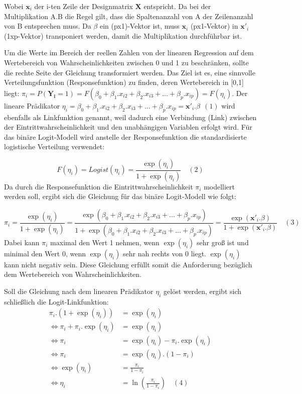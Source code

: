 \documentclass[12pt,]{article}
\begin{document}
Wobei \(\mathbf{x}_i\) der i-ten Zeile der Designmatrix \(\mathbf{X}\)
entspricht. Da bei der Multiplikation A.B die Regel gilt, dass die
Spaltenanzahl von A der Zeilenanzahl von B entsprechen muss. Da
\(\beta\) ein (px1)-Vektor ist, muss \(\mathbf{x}_i\) (px1-Vektor) in
\(\mathbf{x'}_i\) (1xp-Vektor) transponiert werden, damit die
Multiplikation durchführbar ist.

Um die Werte im Bereich der reellen Zahlen von der linearen Regression
auf dem Wertebereich von Wahrscheinlichkeiten zwischen 0 und 1 zu
beschränken, sollte die rechte Seite der Gleichung transformiert werden.
Das Ziel ist es, eine sinnvolle Verteilungsfunktion (Responsefunktion)
zu finden, deren Wertebereich in {[}0,1{]} liegt:
\(\pi_i = P(\mathbf{Y_i} = 1) = F(\beta_0 + \beta_1.x_{i2} + \beta_2.x_{i3} + ... + \beta_p.x_{ip}) = F(\eta_i)\).
Der lineare Prädikator
\(\eta_i = \beta_0 + \beta_1.x_{i2} + \beta_2.x_{i3} + ... + \beta_p.x_{ip} = \mathbf{x'}_i.\beta \ \ (1)\)
wird ebenfalls als Linkfunktion genannt, weil dadurch eine Verbindung
(Link) zwischen der Eintrittwahrscheinlichkeit und den unabhängigen
Variablen erfolgt wird. Für das binäre Logit-Modell wird anstelle der
Responsefunktion die standardisierte logistische Verteilung verwendet:

\[
F(\eta_i) = Logist(\eta_i) = \frac{\exp(\eta_i)}{1 + \exp(\eta_i)} \quad (2)
\] Da durch die Responsefunktion die Eintrittwahrscheinlichkeit
\(\pi_i\) modelliert werden soll, ergibt sich die Gleichung für das
binäre Logit-Modell wie folgt:

\[
\pi_i = \frac{\exp(\eta_i)}{1 + \exp(\eta_i)} = \frac{\exp(\beta_0 + \beta_1.x_{i2} + \beta_2.x_{i3} + ... + \beta_p.x_{ip})}{1 + \exp(\beta_0 + \beta_1.x_{i2} + \beta_2.x_{i3} + ... + \beta_p.x_{ip})} = \frac{\exp(\mathbf{x'}_i.\beta)}{1+\exp(\mathbf{x'}_i.\beta)} \quad (3)
\] Dabei kann \(\pi_i\) maximal den Wert 1 nehmen, wenn \(\exp(\eta_i)\)
sehr groß ist und minimal den Wert 0, wenn \(\exp(\eta_i)\) sehr nah
rechts von 0 liegt. \(\exp(\eta_i)\) kann nicht negativ sein. Diese
Gleichung erfüllt somit die Anforderung bezüglich dem Wertebereich von
Wahrscheinlichkeiten.

Soll die Gleichung nach dem linearen Prädikator \(\eta_i\) gelöst
werden, ergibt sich schließlich die Logit-Linkfunktion: \[
\begin{aligned}
\pi_i.(1 + \exp(\eta_i)) &= \exp(\eta_i) \\
\Leftrightarrow \pi_i + \pi_i.\exp(\eta_i) &= \exp(\eta_i) \\
\Leftrightarrow \pi_i &= \exp(\eta_i) - \pi_i.\exp(\eta_i)  \\
\Leftrightarrow \pi_i &= \exp(\eta_i).(1-\pi_i) \\
\Leftrightarrow \exp(\eta_i) &= \frac{\pi_i}{1-\pi_i} \\
\Leftrightarrow \eta_i &= \ln(\frac{\pi_i}{1-\pi_i}) \quad (4)\\
\end{aligned} 
\]
\end{document}
